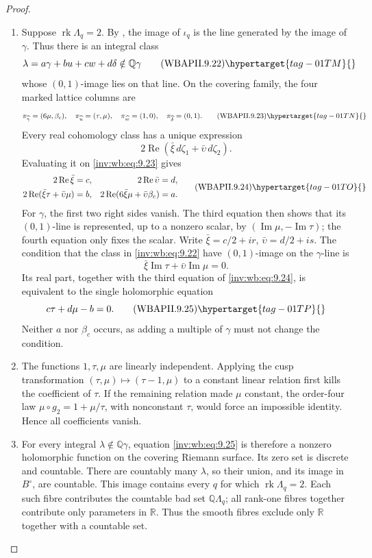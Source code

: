 \begin{proof}
\begin{enumerate}[label={$\langle1\rangle$\arabic*.},leftmargin=*]
\item Suppose \(\operatorname{rk}\Lambda_q=2\).  By
, the image of \(\iota_q\) is the line
generated by the image of \(\gamma\).  Thus there is an integral class
\[
 \lambda=a\gamma+bu+cw+d\delta\notin\mathbb Q\gamma
\tag{WBAPII.9.22}\hypertarget{tag-01TM}{}\label{inv:wb:eq:9.22}
\]
whose \((0,1)\)-image lies on that line.  On the covering family, the four
marked lattice columns are
\[
 \pi_{\widehat\gamma}=(6\mu,\beta_c),\quad
 \pi_{\widehat u}=(\tau,\mu),\quad
 \pi_{\widehat w}=(1,0),\quad
 \pi_{\widehat\delta}=(0,1).
\tag{WBAPII.9.23}\hypertarget{tag-01TN}{}\label{inv:wb:eq:9.23}
\]
Every real cohomology class has a unique expression
\[
 2\operatorname{Re}(\bar\xi\,d\zeta_1+
                       \bar\upsilon\,d\zeta_2).
\]
Evaluating it on \eqref{inv:wb:eq:9.23} gives
\[
\begin{aligned}
2\operatorname{Re}\bar\xi&=c,&
2\operatorname{Re}\bar\upsilon&=d,\\
2\operatorname{Re}(\bar\xi\tau+\bar\upsilon\mu)&=b,&
2\operatorname{Re}(6\bar\xi\mu+\bar\upsilon\beta_c)&=a.
\end{aligned}
\tag{WBAPII.9.24}\hypertarget{tag-01TO}{}\label{inv:wb:eq:9.24}
\]
For \(\gamma\), the first two right sides vanish.  The third equation then
shows that its \((0,1)\)-line is represented, up to a nonzero scalar, by
\((\operatorname{Im}\mu,-\operatorname{Im}\tau)\); the fourth equation
only fixes the scalar.  Write
\(\bar\xi=c/2+ir\), \(\bar\upsilon=d/2+is\).  The condition that the class
in \eqref{inv:wb:eq:9.22} have \((0,1)\)-image on the \(\gamma\)-line is
\[
 \bar\xi\operatorname{Im}\tau+
 \bar\upsilon\operatorname{Im}\mu=0.
\]
Its real part, together with the third equation of \eqref{inv:wb:eq:9.24}, is equivalent
to the single holomorphic equation
\[
 c\tau+d\mu-b=0.
\tag{WBAPII.9.25}\hypertarget{tag-01TP}{}\label{inv:wb:eq:9.25}
\]
Neither \(a\) nor \(\beta_c\) occurs, as adding a multiple of \(\gamma\)
must not change the condition.

\item The functions \(1,\tau,\mu\) are linearly independent.  Applying the cusp
transformation \((\tau,\mu)\mapsto(\tau-1,\mu)\) to a constant linear
relation first kills the coefficient of \(\tau\).  If the remaining
relation made \(\mu\) constant, the order-four law
\(\mu\circ g_2=1+\mu/\tau\), with nonconstant \(\tau\), would force an
impossible identity.  Hence all coefficients vanish.

\item For every integral \(\lambda\notin\mathbb Q\gamma\), equation \eqref{inv:wb:eq:9.25} is
therefore a nonzero holomorphic function on the covering Riemann surface.
Its zero set is discrete and countable.  There are countably many
\(\lambda\), so their union, and its image in \(B^\circ\), are countable.
This image contains every \(q\) for which
\(\operatorname{rk}\Lambda_q=2\).  Each such fibre contributes the
countable bad set \(\mathbb Q\Lambda_q\); all rank-one fibres together
contribute only parameters in \(\mathbb R\).  Thus the smooth fibres
exclude only \(\mathbb R\) together with a countable set.


\end{enumerate}
\end{proof}
